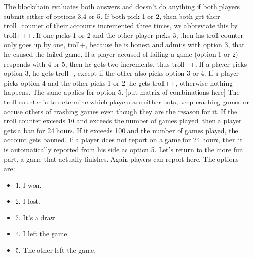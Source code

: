 \documentclass{article}
\begin{document}
%
The blockchain evaluates both answers and doesn't do anything if both players submit either of options 3,4 or 5. If both pick 1 or 2, then both get their troll\_counter of their accounts incremented three times, we abbreviate this by troll+++. If one picks 1 or 2 and the other player picks 3, then his troll counter only goes up by one, troll+, because he is honest and admits with option 3, that he caused the failed game. If a player accused of failing a game (option 1 or 2) responds with 4 or 5, then he gets two increments, thus troll++. If a player picks option 3, he gets troll+, except if the other also picks option 3 or 4. If a player picks option 4 and the other picks 1 or 2, he gets troll++, otherwise nothing happens. The same applies for option 5. 
%
[put matrix of combinations here] 
%
The troll counter is to determine which players are either bots, keep crashing games or accuse others of crashing games even though they are the resason for it. If the troll counter exceeds 10 and exceeds the number of games played, then a player gets a ban for 24 hours. If it exceeds 100 and the number of games played, the account gets banned. If a player does not report on a game for 24 hours, then it is automatically reported from his side as option 5.
%
\newline \newline
%
Let's return to the more fun part, a game that actually finishes. Again players can report here. The options are:
%
\begin{itemize}
	\item 1. I won.
	\item 2. I lost.
	\item 3. It's a draw.
	\item 4. I left the game.
	\item 5. The other left the game.
\end{itemize}
%
\end{document}
